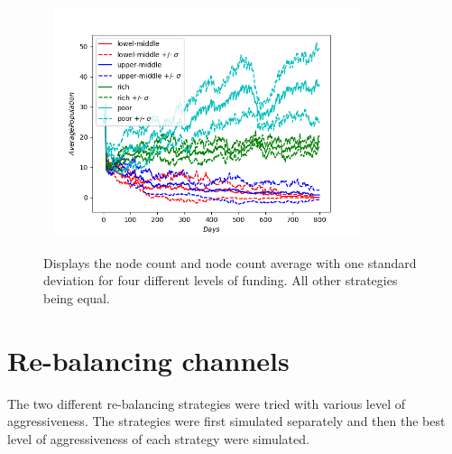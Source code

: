 \begin{figure}[!htb]
	\hspace*{-0.7cm}\
	\centering
	\includegraphics[width=9cm]{images/histories_deviation_fund.png}
	\caption{ Displays the node count and node count average with one standard deviation for four different levels of funding. All other strategies being equal.
	}
	\label{fig:funding}
	\hspace*{2mm} 
\end{figure}

\newpage

\section{Re-balancing channels}

The two different re-balancing  strategies were tried with various level of aggressiveness. The strategies were first simulated separately and then the best level of aggressiveness of each strategy were simulated. 


